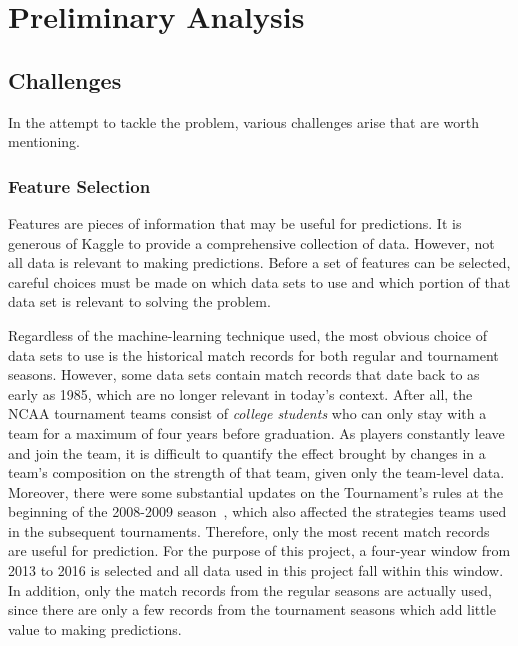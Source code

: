 \chapter{Preliminary Analysis}\label{Chap:2}

\section{Challenges}

In the attempt to tackle the problem, various challenges arise that are worth mentioning.
%

\subsection{Feature Selection}

Features are pieces of information that may be useful for predictions. It is generous of Kaggle to provide a comprehensive collection of data. However, not all data is relevant to making predictions. Before a set of features can be selected, careful choices must be made on which data sets to use and which portion of that data set is relevant to solving the problem. 

Regardless of the machine-learning technique used, the most obvious choice of data sets to use is the historical match records for both regular and tournament seasons. However, some data sets contain match records that date back to as early as 1985, which are no longer relevant in today's context. After all, the NCAA tournament teams consist of \emph{college students} who can only stay with a team for a maximum of four years before graduation. As players constantly leave and join the team, it is difficult to quantify the effect brought by changes in a team's composition on the strength of that team, given only the team-level data. Moreover, there were some substantial updates on the Tournament's rules at the beginning of the 2008-2009 season~\cite{NP15}, which also affected the strategies teams used in the subsequent tournaments. Therefore, only the most recent match records are useful for prediction. For the purpose of this project, a four-year window from 2013 to 2016 is selected and all data used in this project fall within this window. In addition, only the match records from the regular seasons are actually used, since there are only a few records from the tournament seasons which add little value to making predictions. 

